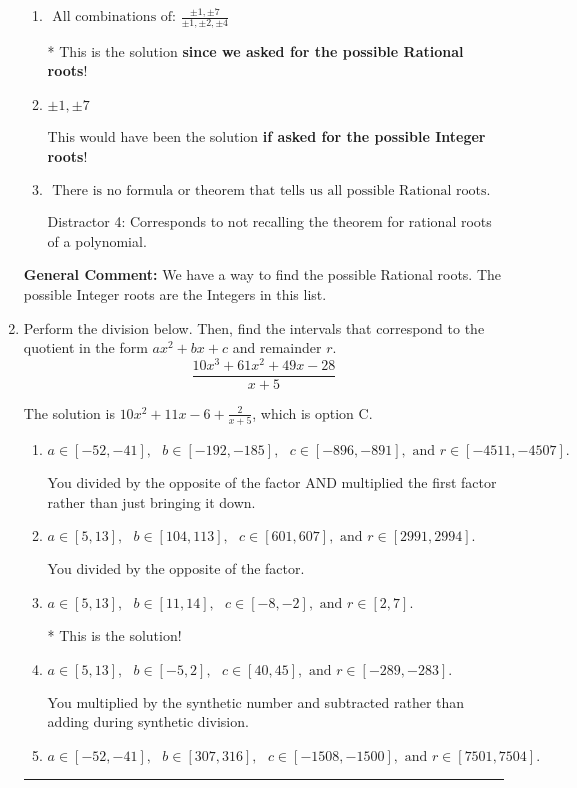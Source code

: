 \documentclass{extbook}[14pt]
\newcommand{\litem}[1]{\item #1

\rule{\textwidth}{0.4pt}}
\begin{document}
\begin{enumerate}
{\begin{enumerate}[label=\Alph*.]
 Distractor 3: Corresponds to the plus or minus of the inverse quotient (an/a0) of the factors. 
\item \( \text{ All combinations of: }\frac{\pm 1,\pm 7}{\pm 1,\pm 2,\pm 4} \)

* This is the solution \textbf{since we asked for the possible Rational roots}!
\item \( \pm 1,\pm 7 \)

This would have been the solution \textbf{if asked for the possible Integer roots}!
\item \( \text{ There is no formula or theorem that tells us all possible Rational roots.} \)

 Distractor 4: Corresponds to not recalling the theorem for rational roots of a polynomial.
\end{enumerate}

\textbf{General Comment:} We have a way to find the possible Rational roots. The possible Integer roots are the Integers in this list.
}
\litem{
Perform the division below. Then, find the intervals that correspond to the quotient in the form $ax^2+bx+c$ and remainder $r$.
\[ \frac{10x^{3} +61 x^{2} +49 x -28}{x + 5} \]

The solution is \( 10x^{2} +11 x -6 + \frac{2}{x + 5} \), which is option C.\begin{enumerate}[label=\Alph*.]
\item \( a \in [-52, -41], \text{   } b \in [-192, -185], \text{   } c \in [-896, -891], \text{   and   } r \in [-4511, -4507]. \)

 You divided by the opposite of the factor AND multiplied the first factor rather than just bringing it down.
\item \( a \in [5, 13], \text{   } b \in [104, 113], \text{   } c \in [601, 607], \text{   and   } r \in [2991, 2994]. \)

 You divided by the opposite of the factor.
\item \( a \in [5, 13], \text{   } b \in [11, 14], \text{   } c \in [-8, -2], \text{   and   } r \in [2, 7]. \)

* This is the solution!
\item \( a \in [5, 13], \text{   } b \in [-5, 2], \text{   } c \in [40, 45], \text{   and   } r \in [-289, -283]. \)

 You multiplied by the synthetic number and subtracted rather than adding during synthetic division.
\item \( a \in [-52, -41], \text{   } b \in [307, 316], \text{   } c \in [-1508, -1500], \text{   and   } r \in [7501, 7504]. \)


\end{enumerate}}
\end{enumerate}
\end{document}
